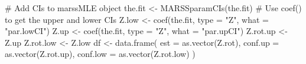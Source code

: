 \begin{Schunk}
\begin{Sinput}
 # Add CIs to marssMLE object
 the.fit <- MARSSparamCIs(the.fit)
 # Use coef() to get the upper and lower CIs
 Z.low <- coef(the.fit, type = "Z", what = "par.lowCI")
 Z.up <- coef(the.fit, type = "Z", what = "par.upCI")
 Z.rot.up <- Z.up %*% H.inv
 Z.rot.low <- Z.low %*% H.inv
 df <- data.frame(
   est = as.vector(Z.rot), 
   conf.up = as.vector(Z.rot.up), 
   conf.low = as.vector(Z.rot.low)
   )
\end{Sinput}
\end{Schunk}
